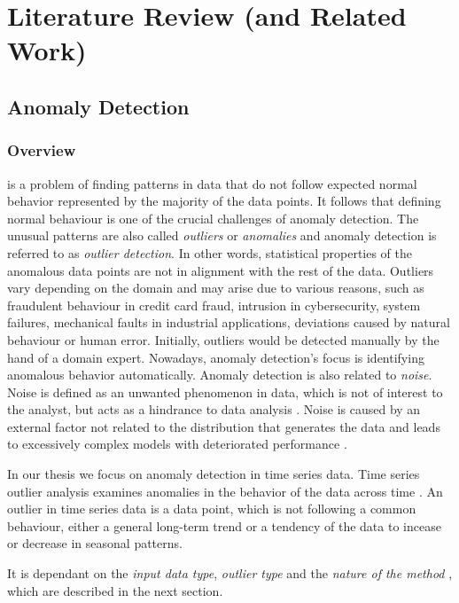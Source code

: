 \chapter{Literature Review (and Related Work)}

\section{Anomaly Detection}
\subsection{Overview}

 is a problem of finding patterns in data that do not follow expected normal behavior represented by the majority of the data points. It follows that defining normal behaviour is one of the crucial challenges of anomaly detection. The unusual patterns are also called \textit{outliers} or \textit{anomalies} and anomaly detection is referred to as \textit{outlier detection}. In other words, statistical properties of the anomalous data points are not in alignment with the rest of the data. Outliers vary depending on the domain and may arise due to various reasons, such as fraudulent behaviour in credit card fraud, intrusion in cybersecurity, system failures, mechanical faults in industrial applications, deviations caused by natural behaviour or human error. Initially, outliers would be detected manually by the hand of a domain expert. Nowadays, anomaly detection's focus is identifying anomalous behavior automatically. Anomaly detection is also related to \textit{noise}. Noise is defined as an unwanted phenomenon in data, which is not of interest to the analyst, but acts as a hindrance to data analysis \cite{cvbakv2009}. Noise is  caused by an external factor not related to the distribution that generates the data \cite{ggh2017} and leads to excessively complex models with deteriorated performance \cite{wu2007}. 

In our thesis we focus on anomaly detection in time series data. Time series outlier analysis examines anomalies in the behavior of the data across time \cite{gupta2014}. An outlier in time series data is a data point, which is not following a common behaviour, either a general long-term trend or a tendency of the data to incease or decrease in seasonal patterns. 

It is dependant on the \textit{input data type}, \textit{outlier type} and the \textit{nature of the method} \cite{gcml2020}, which are described in the next section.

